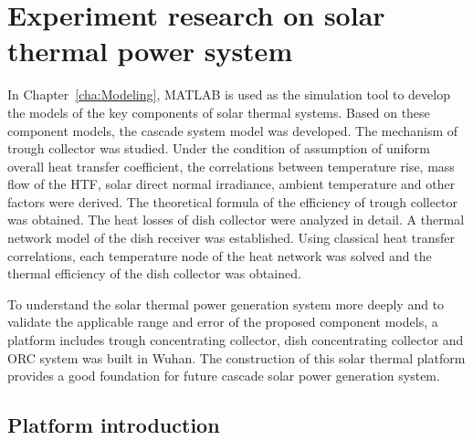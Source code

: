 \chapter{Experiment research on solar thermal power system}

In Chapter~\ref{cha:Modeling}, MATLAB is used as the simulation tool to develop the models of the key components of solar thermal systems. Based on these component models, the cascade system model was developed.
The mechanism of trough collector was studied. Under the condition of assumption of uniform overall heat transfer coefficient, the correlations between temperature rise, mass flow of the HTF, solar direct normal irradiance, ambient temperature and other factors were derived. The theoretical formula of the efficiency of trough collector was obtained.
The heat losses of dish collector were analyzed in detail. A thermal network model of the dish receiver was established. Using classical heat transfer correlations, each temperature node of the heat network was solved and the thermal efficiency of the dish collector was obtained.

To understand the solar thermal power generation system more deeply and to validate the applicable range and error of the proposed component models, a platform includes trough concentrating collector, dish concentrating collector and ORC system was built in Wuhan. The construction of this solar thermal platform provides a good foundation for future cascade solar power generation system.

\section{Platform introduction}

